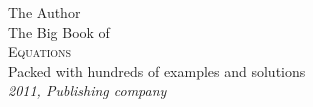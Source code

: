 \begin{titlepage}
    \raggedleft
    {\Large The Author\\[1in]}
    {\large The Big Book of\\}
    {\Huge\scshape Equations\\[.2in]}
    {\large Packed with hundreds of examples and solutions\\}
    \vfill
    {\itshape 2011, Publishing company}
\end{titlepage}
